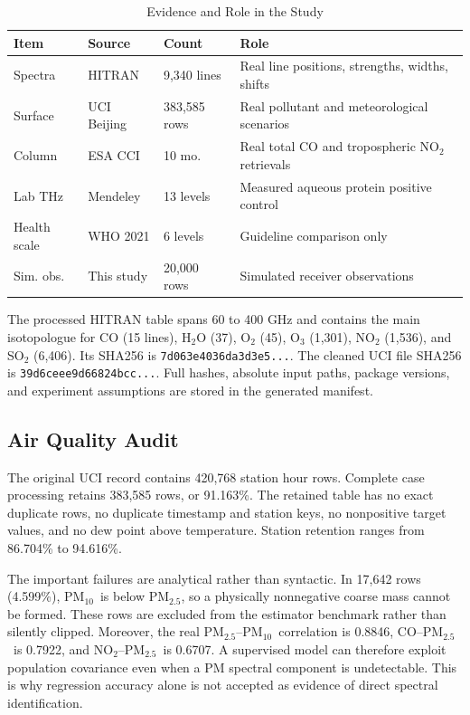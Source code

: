\documentclass[conference]{IEEEtran}
\newcommand{\pmfive}{PM$_{2.5}$}
\newcommand{\pmten}{PM$_{10}$}
\begin{document}
\begin{table}[t]
\caption{Evidence and Role in the Study}
\label{tab:evidence}
\centering
\scriptsize
\setlength{\tabcolsep}{2.0pt}
\begin{tabular}{@{}p{0.95cm}p{1.35cm}p{0.96cm}p{2.99cm}@{}}
\toprule
Item & Source & Count & Role \\
\midrule
Spectra & HITRAN & 9,340 lines & Real line positions, strengths, widths, shifts \\
Surface & UCI Beijing & 383,585 rows & Real pollutant and meteorological scenarios \\
Column & ESA CCI & 10 mo. & Real total CO and tropospheric NO$_2$ retrievals \\
Lab THz & Mendeley & 13 levels & Measured aqueous protein positive control \\
Health scale & WHO 2021 & 6 levels & Guideline comparison only \\
Sim. obs. & This study & 20,000 rows & Simulated receiver observations \\
\bottomrule
\end{tabular}
\end{table}

The processed HITRAN table spans 60 to 400 GHz and contains the main isotopologue for CO (15 lines), H$_2$O (37), O$_2$ (45), O$_3$ (1,301), NO$_2$ (1,536), and SO$_2$ (6,406). Its SHA256 is \texttt{7d063e4036da3d3e5...}. The cleaned UCI file SHA256 is \texttt{39d6ceee9d66824bcc...}. Full hashes, absolute input paths, package versions, and experiment assumptions are stored in the generated manifest.

\subsection{Air Quality Audit}

The original UCI record contains 420,768 station hour rows. Complete case processing retains 383,585 rows, or 91.163\%. The retained table has no exact duplicate rows, no duplicate timestamp and station keys, no nonpositive target values, and no dew point above temperature. Station retention ranges from 86.704\% to 94.616\%.

The important failures are analytical rather than syntactic. In 17,642 rows (4.599\%), \pmten\ is below \pmfive, so a physically nonnegative coarse mass cannot be formed. These rows are excluded from the estimator benchmark rather than silently clipped. Moreover, the real \pmfive--\pmten\ correlation is 0.8846, CO--\pmfive\ is 0.7922, and NO$_2$--\pmfive\ is 0.6707. A supervised model can therefore exploit population covariance even when a PM spectral component is undetectable. This is why regression accuracy alone is not accepted as evidence of direct spectral identification.
\end{document}
